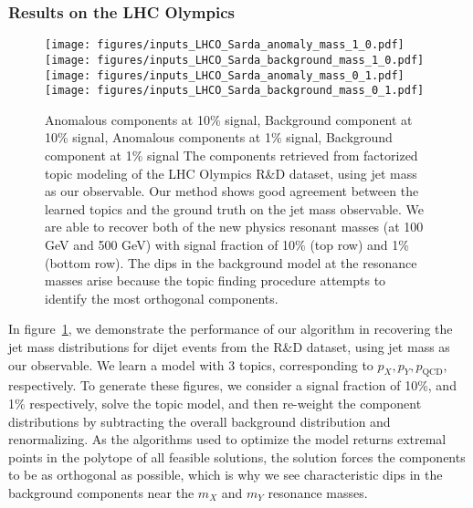 \documentclass[a4paper,11pt]{article}
\DeclareRobustCommand{\Fig}[1]{figure~\ref{#1}}
\begin{document}
\subsubsection{Results on the LHC Olympics}
\label{sec:results}

\begin{figure}[ht!]
\centering
  \centering
  \texttt{[image: figures/inputs\_LHCO\_Sarda\_anomaly\_mass\_1\_0.pdf]}
  \texttt{[image: figures/inputs\_LHCO\_Sarda\_background\_mass\_1\_0.pdf]}
  \texttt{[image: figures/inputs\_LHCO\_Sarda\_anomaly\_mass\_0\_1.pdf]}
  \texttt{[image: figures/inputs\_LHCO\_Sarda\_background\_mass\_0\_1.pdf]}
\caption{Anomalous components at 10\% signal, Background component at 10\% signal, Anomalous components at 1\% signal, Background component at 1\% signal\label{fig:anomaly_observables}
The components retrieved from factorized topic modeling of the LHC Olympics R\&D dataset, using jet mass as our observable.
Our method shows good agreement between the learned topics and the ground truth on the jet mass observable.
We are able to recover both of the new physics resonant masses (at 100 GeV and 500 GeV) with signal fraction of 10\% (top row) and 1\% (bottom row).
The dips in the background model at the resonance masses arise because the topic finding procedure attempts to identify the most orthogonal components.
}
\end{figure}

In \Fig{fig:anomaly_observables}, we demonstrate the performance of our algorithm in recovering the jet mass distributions for dijet events from the R\&D dataset, using jet mass as our observable.
We learn a model with 3 topics, corresponding to $p_X, p_Y, p_{\text{QCD}}$, respectively.
To generate these figures, we consider a signal fraction of 10\%, and 1\% respectively, solve the topic model, and then re-weight the component distributions by subtracting the overall background distribution and renormalizing.
As the algorithms used to optimize the model returns extremal points in the polytope of all feasible solutions, the solution forces the components to be as orthogonal as possible, which is why we see characteristic dips in the background components near the $m_X$ and $m_Y$ resonance masses.
\end{document}
